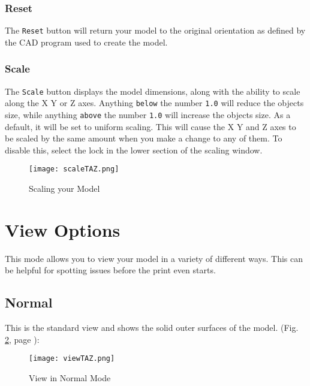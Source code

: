 \subsubsection{Reset}
The \texttt{Reset} button will return your model to the original orientation as defined by the CAD program used to create the model.

\subsubsection{Scale}
The \texttt{Scale} button displays the model dimensions, along with the ability to scale along the X Y or Z axes. Anything \texttt{below} the number \texttt{1.0} will reduce the objects size, while anything \texttt{above} the number \texttt{1.0} will increase the objects size. As a default, it will be set to uniform scaling. This will cause the X Y and Z axes to be scaled by the same amount when you make a change to any of them. To disable this, select the lock in the lower section of the scaling window. 
\begin{figure}[H]
\centering
\texttt{[image: scaleTAZ.png]}
\caption{Scaling your Model}
\label{fig:Scaling your Model}
\end{figure}

\section{View Options}
This mode allows you to view your model in a variety of different ways. This can be helpful for spotting issues before the print even starts. 

\subsection{Normal}
This is the standard view and shows the solid outer surfaces of the model. (Fig. \ref{fig:Normal View}, page \pageref{fig:Normal View}): 

\begin{figure}[H]
\centering
\texttt{[image: viewTAZ.png]}
\caption{View in Normal Mode}
\label{fig:Normal View}
\end{figure}

